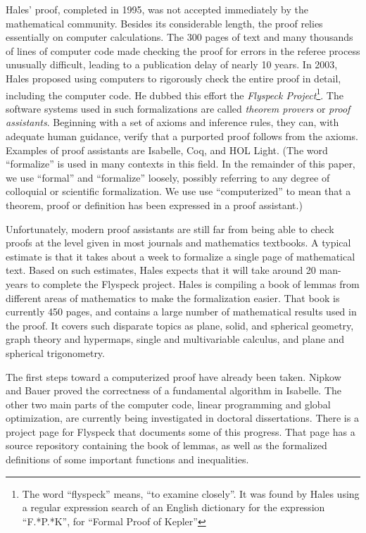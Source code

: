 Hales' proof, completed in 1995, was not accepted immediately by the
mathematical community.  Besides its considerable length, the proof
relies essentially on computer calculations.  The 300 pages of text
and many thousands of lines of computer code made checking the proof
for errors in the referee process unusually difficult, leading to a
publication delay of nearly 10 years.  In 2003, Hales proposed using
computers to rigorously check the entire proof in detail, including
the computer code.  He dubbed this effort the \textit{Flyspeck
  Project}\footnote{The word ``flyspeck'' means, ``to examine
  closely''.  It was found by Hales using a regular expression search
  of an English dictionary for the expression ``F.*P.*K'', for
  ``Formal Proof of Kepler''}.  The software systems used in such
formalizations are called \textit{theorem provers} or \textit{proof
  assistants}.  Beginning with a set of axioms and inference rules,
they can, with adequate human guidance, verify that a purported proof
follows from the axioms.  Examples of proof assistants are
Isabelle\cite{Paulson:1994:Isabelle}, Coq\cite{Bertot:2004:CoqBook},
and HOL Light\cite{Harrison:2000:HOL-Light}. (The word ``formalize'' is used
in many contexts in this field.  In the remainder of this paper, we
use ``formal'' and ``formalize'' loosely, possibly referring to 
any degree of colloquial or scientific formalization.  We use
use ``computerized'' to mean that a theorem, proof or definition has
been expressed in a proof assistant.)

  Unfortunately, modern proof assistants are still far from being able to check
proofs at the level given in most journals and mathematics textbooks.  A typical
estimate is that it takes about a week to formalize a single page of mathematical
text.  Based on such estimates, Hales expects that it will take 
around 20 man-years to complete the Flyspeck project.  
Hales is compiling a book\cite{Hales:2007:FlyspeckBook}
of lemmas from different areas of mathematics to make the formalization easier.    
That book is currently 450 pages, and contains a large number of mathematical
results used in the proof.  It covers such disparate topics
as plane, solid, and spherical geometry, graph theory and hypermaps, single and
multivariable calculus, and plane and spherical trigonometry.

The first steps toward a computerized proof have already been taken.
Nipkow and Bauer\cite{Nipkow:2005:Tame} proved the correctness of a
fundamental algorithm in Isabelle.  The other two main parts of the
computer code, linear programming and global optimization, are
currently being investigated in doctoral
dissertations\cite{Zumkeller:2006:TaylorModels,Obua:2005:LinearPrograms}.
There is a project page\cite{website:FlyspeckProjectPage} for Flyspeck
that documents some of this progress.  That page has a source
repository containing the book of lemmas, as well as the formalized
definitions of some important functions and inequalities.  

